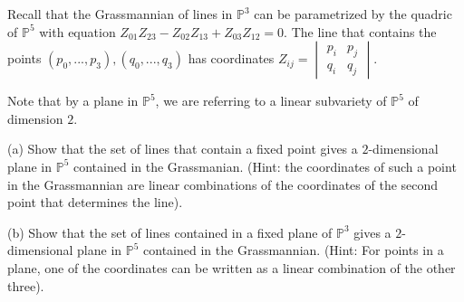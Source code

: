 \documentclass[10pt]{article}
\newenvironment{problem}[2][Problem]{\begin{trivlist}
\item[\hskip \labelsep {\bfseries #1}\hskip \labelsep {\bfseries #2.}]}{\end{trivlist}}
\begin{document}
\begin{problem}{5.4}

Recall that the Grassmannian of lines in $\mathbb{P}^3$ can be parametrized by the quadric of $\mathbb{P}^5$ with equation $Z_{01}Z_{23} - Z_{02}Z_{13} + Z_{03}Z_{12} = 0$. The line that contains the points $(p_0,...,p_3),(q_0,...,q_3)$ has coordinates $Z_{ij} =\begin{vmatrix} p_i & p_j \\  q_i & q_j \end{vmatrix}$.

Note that by a plane in $\mathbb{P}^5$, we are referring to a linear subvariety of $\mathbb{P}^5$ of dimension $2$.

(a) Show that the set of lines that contain a fixed point gives a $2$-dimensional plane in $\mathbb{P}^5$ contained in the Grassmanian. (Hint: the coordinates of such a point in the Grassmannian are linear combinations of the coordinates of the second point that determines the line).

(b) Show that the set of lines contained in a fixed plane of $\mathbb{P}^3$ gives a $2$-dimensional plane in $\mathbb{P}^5$ contained in the Grassmannian. (Hint: For points in a plane, one of the coordinates can be written as a linear combination of the other three).

\end{problem}
\end{document}
